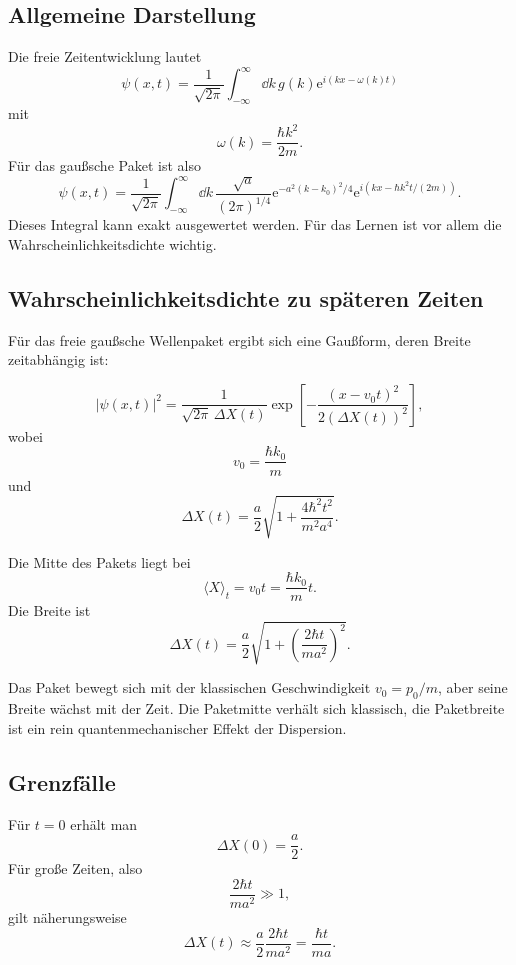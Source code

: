 \subsection{Allgemeine Darstellung}

Die freie Zeitentwicklung lautet
\[
    \psi(x,t)=\frac{1}{\sqrt{2\pi}}
    \int_{-\infty}^{\infty}\dd k\,
    g(k)\mathrm{e}^{i(kx-\omega(k)t)}
\]
mit
\[
    \omega(k)=\frac{\hbar k^2}{2m}.
\]
Für das gaußsche Paket ist also
\[
    \psi(x,t)=\frac{1}{\sqrt{2\pi} }
    \int_{-\infty}^{\infty}\dd k\,
    \frac{\sqrt{a}}{(2\pi)^{1/4}}
    \mathrm{e}^{-a^2(k-k_0)^2/4}
    \mathrm{e}^{i(kx-\hbar k^2t/(2m))}.
\]
Dieses Integral kann exakt ausgewertet werden. Für das Lernen ist vor allem die Wahrscheinlichkeitsdichte wichtig.

\subsection{Wahrscheinlichkeitsdichte zu späteren Zeiten}

Für das freie gaußsche Wellenpaket ergibt sich eine Gaußform, deren Breite zeitabhängig ist:
\begin{formulabox}
\[
    |\psi(x,t)|^2
    =\frac{1}{\sqrt{2\pi}\,\Delta X(t)}
    \exp\left[-\frac{(x-v_0t)^2}{2(\Delta X(t))^2}\right],
\]
wobei
\[
    v_0=\frac{\hbar k_0}{m}
\]
und
\[
    \Delta X(t)=\frac{a}{2}
    \sqrt{1+\frac{4\hbar^2t^2}{m^2a^4}}.
\]
\end{formulabox}

Die Mitte des Pakets liegt bei
\[
    \langle X\rangle_t=v_0t=\frac{\hbar k_0}{m}t.
\]
Die Breite ist
\[
    \Delta X(t)=\frac{a}{2}
    \sqrt{1+\left(\frac{2\hbar t}{ma^2}\right)^2}.
\]

\begin{conceptbox}
Das Paket bewegt sich mit der klassischen Geschwindigkeit $v_0=p_0/m$, aber seine Breite wächst mit der Zeit. Die Paketmitte verhält sich klassisch, die Paketbreite ist ein rein quantenmechanischer Effekt der Dispersion.
\end{conceptbox}

\subsection{Grenzfälle}

Für $t=0$ erhält man
\[
    \Delta X(0)=\frac{a}{2}.
\]
Für große Zeiten, also
\[
    \frac{2\hbar t}{ma^2}\gg 1,
\]
gilt näherungsweise
\[
    \Delta X(t)\approx \frac{a}{2}\frac{2\hbar t}{ma^2}
    =\frac{\hbar t}{ma}.
\]

